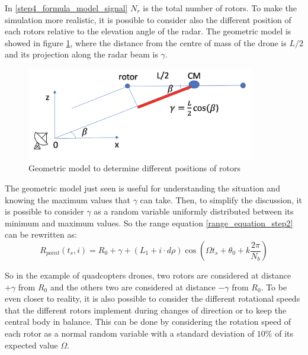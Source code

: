 In \ref{step4_formula_model_signal} $N_{r}$ is the total number of rotors. To make the simulation more realistic, it is possible to consider also the different position of each rotors relative to the elevation angle of the radar. The geometric model is showed in figure \ref{gemetric_rotors}, where the distance from the centre of mass of the drone is $L/2$ and its projection along the radar beam is $\gamma$.

\begin{figure}[h!]
\centering
\includegraphics[width=10cm]{FMCW mD analysis-chap4/img/diff_pos_rotors.png}
\caption{Geometric model to determine different positions of rotors}
\label{gemetric_rotors}
\end{figure}

The geometric model just seen is useful for understanding the situation and knowing the maximum values that $\gamma$ can take. Then, to simplify the discussion, it is possible to consider $\gamma$ as a random variable uniformly distributed between its minimum and maximum values.
So the range equation \ref{range_equation_step2} can be rewritten as:
\begin{equation}
R_{point}(t_s,i)=R_{0} + \gamma +(L_1+i \cdot d\rho)\cos \left(\Omega t_{s}+\theta_{0} + k \frac{2\pi}{N_{b}}\right)
\label{step4-range-eq}
\end{equation}

So in the example of quadcopters drones, two rotors are considered at distance $+\gamma$ from $R_{0}$ and the others two are considered at distance $-\gamma$ from $R_{0}$.
To be even closer to reality, it is also possible to consider the different rotational speeds that the different rotors implement during changes of direction or to keep the central body in balance. This can be done by considering the rotation speed of each rotor as a normal random variable with a standard deviation of $10\%$ of its expected value $\Omega$.

